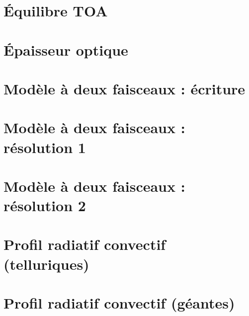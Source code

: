 \documentclass[a4paper,DIV16,10pt]{scrartcl}
\begin{document}
\newpage
\section{\'Equilibre TOA}


%

%

\newpage
\section{\'Epaisseur optique}


\newpage
\section{Modèle à deux faisceaux : écriture}


\newpage
\section{Modèle à deux faisceaux : résolution 1}


\newpage
\section{Modèle à deux faisceaux : résolution 2}


\newpage
\section{Profil radiatif convectif (telluriques)}


\newpage
\section{Profil radiatif convectif (géantes)}


%

%
\end{document}
